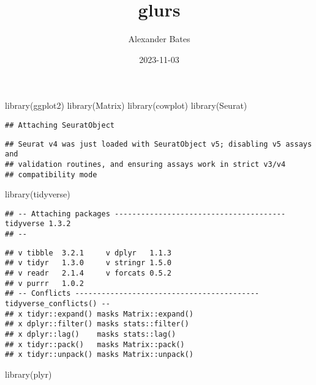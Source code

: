\documentclass[
]{article}
\title{glurs}
\author{Alexander Bates}
\date{2023-11-03}
\newenvironment{Shaded}{\begin{snugshade}}{\end{snugshade}}
\newcommand{\FunctionTok}[1]{\textcolor[rgb]{0.00,0.00,0.00}{#1}}
\newcommand{\NormalTok}[1]{#1}
\begin{document}
\maketitle

\begin{Shaded}
\begin{Highlighting}[]
\FunctionTok{library}\NormalTok{(ggplot2)}
\FunctionTok{library}\NormalTok{(Matrix)}
\FunctionTok{library}\NormalTok{(cowplot)}
\FunctionTok{library}\NormalTok{(Seurat)}
\end{Highlighting}
\end{Shaded}

\begin{verbatim}
## Attaching SeuratObject
\end{verbatim}

\begin{verbatim}
## Seurat v4 was just loaded with SeuratObject v5; disabling v5 assays and
## validation routines, and ensuring assays work in strict v3/v4
## compatibility mode
\end{verbatim}

\begin{Shaded}
\begin{Highlighting}[]
\FunctionTok{library}\NormalTok{(tidyverse)}
\end{Highlighting}
\end{Shaded}

\begin{verbatim}
## -- Attaching packages --------------------------------------- tidyverse 1.3.2
## --
\end{verbatim}

\begin{verbatim}
## v tibble  3.2.1     v dplyr   1.1.3
## v tidyr   1.3.0     v stringr 1.5.0
## v readr   2.1.4     v forcats 0.5.2
## v purrr   1.0.2     
## -- Conflicts ------------------------------------------ tidyverse_conflicts() --
## x tidyr::expand() masks Matrix::expand()
## x dplyr::filter() masks stats::filter()
## x dplyr::lag()    masks stats::lag()
## x tidyr::pack()   masks Matrix::pack()
## x tidyr::unpack() masks Matrix::unpack()
\end{verbatim}

\begin{Shaded}
\begin{Highlighting}[]
\FunctionTok{library}\NormalTok{(plyr)}
\end{Highlighting}
\end{Shaded}
\end{document}
